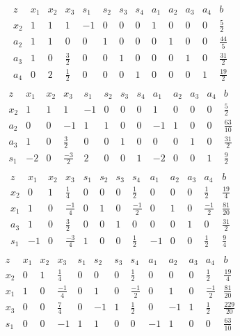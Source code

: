 \documentclass[paper=a4, fontsize=11pt]{article}
\numberwithin{equation}{section} %
\numberwithin{figure}{section} %
\numberwithin{table}{section} %
\begin{document}
\begin{equation}
\begin{array}{c|ccccccccccc|c}
	z & x_1 & x_2 & x_3 & s_1 & s_2 & s_3 & s_4 & a_1 & a_2 & a_3 & a_4 & b \\ \hline
	x_2 & 1 & 1 & 1 & -1 & 0 & 0 & 0 & 1 & 0 & 0 & 0 & \frac{5}{2}\\ 
	a_2 & 1 & 1 & 0 & 0 & 1 & 0 & 0 & 0 & 1 & 0 & 0 & \frac{44}{5}\\
	a_3 & 1 & 0 & \frac{3}{2} & 0 & 0 & 1 & 0 & 0 & 0 & 1 & 0 & \frac{31}{2}\\
	a_4 & 0 & 2 & \frac{1}{2} & 0 & 0 & 0 & 1 & 0 & 0 & 0 & 1 & \frac{19}{2}\\
\end{array}
\end{equation}
\begin{equation}
\begin{array}{c|ccccccccccc|c}
	z & x_1 & x_2 & x_3 & s_1 & s_2 & s_3 & s_4 & a_1 & a_2 & a_3 & a_4 & b \\ \hline
	x_2 & 1 & 1 & 1 & -1 & 0 & 0 & 0 & 1 & 0 & 0 & 0 & \frac{5}{2}\\ 
	a_2 & 0 & 0 & -1 & 1 & 1 & 0 & 0 & -1 & 1 & 0 & 0 & \frac{63}{10}\\
	a_3 & 1 & 0 & \frac{3}{2} & 0 & 0 & 1 & 0 & 0 & 0 & 1 & 0 & \frac{31}{2}\\
	s_1 & -2 & 0 & \frac{-3}{2} & 2 & 0 & 0 & 1 & -2 & 0 & 0 & 1 & \frac{9}{2}\\
\end{array}
\end{equation}
\begin{equation}
\begin{array}{c|ccccccccccc|c}
	z & x_1 & x_2 & x_3 & s_1 & s_2 & s_3 & s_4 & a_1 & a_2 & a_3 & a_4 & b \\ \hline
	x_2 & 0 & 1 & \frac{1}{4} & 0 & 0 & 0 & \frac{1}{2} & 0 & 0 & 0 & \frac{1}{2} & \frac{19}{4}\\ 
	x_1 & 1 & 0 & \frac{-1}{4} & 0 & 1 & 0 & \frac{-1}{2} & 0 & 1 & 0 & \frac{-1}{2} & \frac{81}{20}\\
	a_3 & 1 & 0 & \frac{3}{2} & 0 & 0 & 1 & 0 & 0 & 0 & 1 & 0 & \frac{31}{2}\\
	s_1 & -1 & 0 & \frac{-3}{4} & 1 & 0 & 0 & \frac{1}{2} & -1 & 0 & 0 & \frac{1}{2} & \frac{9}{4}\\
\end{array}
\end{equation}
\begin{equation}
\begin{array}{c|ccccccccccc|c}
	z & x_1 & x_2 & x_3 & s_1 & s_2 & s_3 & s_4 & a_1 & a_2 & a_3 & a_4 & b \\ \hline
	x_2 & 0 & 1 & \frac{1}{4} & 0 & 0 & 0 & \frac{1}{2} & 0 & 0 & 0 & \frac{1}{2} & \frac{19}{4}\\ 
	x_1 & 1 & 0 & \frac{-1}{4} & 0 & 1 & 0 & \frac{-1}{2} & 0 & 1 & 0 & \frac{-1}{2} & \frac{81}{20}\\
	x_3 & 0 & 0 & \frac{7}{4} & 0 & -1 & 1 & \frac{1}{2} & 0 & -1 & 1 & \frac{1}{2} & \frac{229}{20}\\
	s_1 & 0 & 0 & -1 & 1 & 1 & 0 & 0 & -1 & 1 & 0 & 0 & \frac{63}{10}\\
\end{array}
\end{equation}
\end{document}
